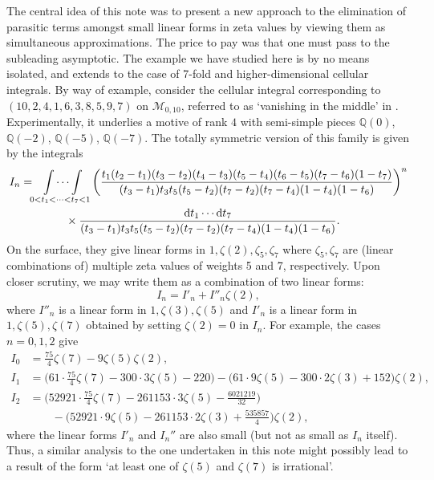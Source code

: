 \documentclass[12pt,reqno]{amsart}
\theoremstyle{remark}
\renewcommand{\d}{{\mathrm d}}
\begin{document}
The central idea of this note was to present a new approach to the elimination of parasitic terms amongst small linear forms in zeta values by viewing them as simultaneous approximations. The  price to pay was that one must pass to the subleading asymptotic.  The example we have studied here is by no means  isolated, and extends to the case of 7-fold and higher-dimensional cellular integrals. By way of example, consider the cellular integral corresponding to $(10,  2, 4, 1, 6, 3, 8, 5, 9, 7)$ on $\mathcal{M}_{0,10}$, referred to as `vanishing in the middle' in \cite[Sect.~10.2.6, Example~(4)]{Br16}. Experimentally, it underlies a motive of rank $4$ with semi-simple pieces $\mathbb{Q}(0)$, $\mathbb{Q}(-2)$, $\mathbb{Q}(-5)$, $\mathbb{Q}(-7)$. The totally symmetric version of this family is given by the integrals
\begin{align*}
I_n
&=\idotsint\limits_{0<t_1<\dots<t_7<1}
\bigg(\frac{t_1(t_2-t_1)(t_3-t_2)(t_4-t_3)(t_5-t_4)(t_6-t_5)(t_7-t_6)(1-t_7)}{(t_3-t_1)t_3t_5(t_5-t_2)(t_7-t_2)(t_7-t_4)(1-t_4)(1-t_6)}\bigg)^n
\\ &\qquad\qquad\times
\frac{\d t_1\dotsb\d t_7}{(t_3-t_1)t_3t_5(t_5-t_2)(t_7-t_2)(t_7-t_4)(1-t_4)(1-t_6)}.
\end{align*}
On the surface, they give linear forms in $1, \zeta(2), \zeta_5, \zeta_7$ where $\zeta_5,\zeta_7$ are (linear combinations of) multiple zeta values of weights 5 and 7, respectively.
Upon closer scrutiny, we may write them as a combination of two linear forms:
\[
I_n= I'_n +  I''_n \zeta(2),
\]
where $I''_n$ is a linear form in $1,\zeta(3), \zeta(5)$ and $I'_n$ is a linear form in $1, \zeta(5), \zeta(7)$ obtained by setting $\zeta(2)=0$ in $I_n$. For example, the cases $n=0,1,2$ give
\begin{align*} 
I_0&  = \frac{75}{4}\zeta(7) - 9\zeta(5)\zeta(2),
\\ 
I_1 & = \Big(61\cdot\frac{75}{4}\zeta(7) - 300\cdot3\zeta(5) - 220\Big)
- \big(61\cdot9\zeta(5) - 300\cdot2\zeta(3) + 152\big) \zeta(2),
\\
I_2 & = \Big(52921\cdot\frac{75}{4}\zeta(7) - 261153\cdot3\zeta(5) - \frac{6021219}{32}\Big)
\\ &\qquad
- \Big(52921\cdot9\zeta(5) - 261153\cdot2\zeta(3) + \frac{535857}{4}\Big)\zeta(2), 
\end{align*}
where the linear forms $I'_n$ and $I_n''$ are also small (but not as small as $I_n$ itself). Thus, a  similar analysis to the one undertaken in this note might possibly lead to a result of the form `at least one of $\zeta(5)$ and $\zeta(7)$ is irrational'.
\end{document}
